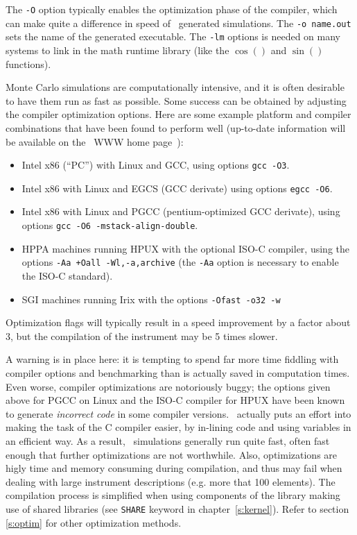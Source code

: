 The \verb+-O+ option typically enables the optimization phase of the compiler,
which can make quite a difference in speed of \MCS\ generated simulations. The
\verb+-o name.out+ sets the name of the generated executable. The \verb+-lm+
options is needed on many systems to link in the math runtime library (like the
$\cos()$ and $\sin()$ functions). 

Monte Carlo simulations are computationally intensive, and it is
often desirable to have them run as fast as possible. Some success can
be obtained by adjusting the compiler optimization
options. Here are some example platform and compiler combinations that
have been found to perform well (up-to-date information will be
available on the \MCS\ WWW home page~\cite{mcstas_webpage}):
\begin{itemize}
\item Intel x86 (``PC'') with Linux and GCC, using options \verb+gcc -O3+.
\item Intel x86 with Linux and EGCS (GCC derivate) using
  options \verb+egcc -O6+.
\item Intel x86 with Linux and PGCC (pentium-optimized GCC derivate), using
  options \verb+gcc -O6 -mstack-align-double+.
\item HPPA machines running HPUX with the optional ISO-C compiler,
  using the options
  \verb|-Aa +Oall -Wl,-a,archive| (the \verb+-Aa+ option is necessary to
  enable the ISO-C standard).
\item SGI machines running Irix with the options
  \verb|-Ofast -o32 -w|
\end{itemize}
Optimization flags will typically result in a speed improvement by a factor
about 3, but the compilation of the instrument may be 5 times slower.

A warning is in place here: it is tempting to spend far more time
fiddling with compiler options and benchmarking than is actually saved
in computation times. Even worse, compiler optimizations are notoriously
buggy; the options given above for PGCC on Linux and the ISO-C compiler
for HPUX have been known to generate \emph{incorrect code} in some
compiler versions. \MCS\ actually puts an effort into making the task of the C compiler
easier, by in-lining code and using variables in an efficient way. As a
result, \MCS\ simulations generally run quite fast, often fast enough
that further optimizations are not worthwhile. Also, optimizations are higly
time and memory consuming during compilation, and thus may fail when dealing
with large instrument descriptions (e.g. more that 100 elements). The compilation process is simplified when using components of the library making use of shared libraries (see \verb+SHARE+ keyword in chapter~\ref{s:kernel}). Refer to section \ref{s:optim} for other optimization methods.

